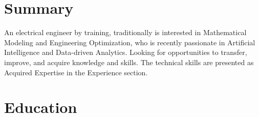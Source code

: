 \documentclass[11pt,letterpaper,sans]{moderncv}
\begin{document}
\makecvtitle
\vspace{-2ex}
\section{Summary}
An electrical engineer by training, traditionally is interested in Mathematical Modeling and Engineering Optimization, who is recently passionate in Artificial Intelligence and Data-driven Analytics. Looking for opportunities to transfer, improve, and acquire knowledge and skills.
The technical skills are presented as Acquired Expertise in the Experience section.



\section{Education}


\end{document}
